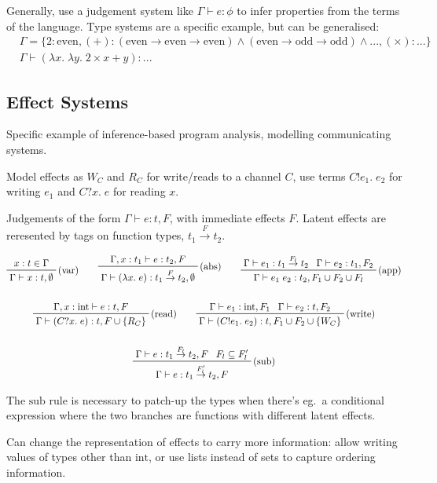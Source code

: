 \documentclass[a4paper, 11pt]{article}
\begin{document}
{
    Generally, use a judgement system like \(\Gamma\vdash e : \phi\) to infer properties from the terms of the language. Type systems are a specific example, but can be generalised:
    \begin{align*}
    & \Gamma = \{2 : \text{even}, (+) : (\text{even}\rightarrow\text{even}\rightarrow\text{even}) \wedge (\text{even}\rightarrow\text{odd}\rightarrow\text{odd}) \wedge ..., (\times) : ...\} \\
    & \Gamma\vdash (\lambda x.\;\lambda y.\;2 \times x + y) : ...
    \end{align*}

    \subsection*{Effect Systems}
    {
        Specific example of inference-based program analysis, modelling communicating systems.

        Model effects as \(W_C\) and \(R_C\) for write/reads to a channel \(C\), use terms \(C!e_1.\;e_2\) for writing \(e_1\) and \(C?x.\;e\) for reading \(x\).

        Judgements of the form \(\Gamma\vdash e : t, F\), with immediate effects \(F\). Latent effects are reresented by tags on function types, \(t_1 \stackrel{F}{\rightarrow} t_2\).

        \begin{gather*}
        \prftree[r]{(var)}
        {x:t \in \Gamma}
        {\Gamma\vdash x : t,\emptyset}
        \qquad
        \prftree[r]{(abs)}
        {\Gamma,x:t_1\vdash e : t_2,F}
        {\Gamma\vdash (\lambda x.\;e) : t_1 \stackrel{F}{\rightarrow} t_2,\emptyset}
        \qquad
        \prftree[r]{(app)}
        {\Gamma\vdash e_1 : t_1 \stackrel{F_l}{\rightarrow} t_2}
        {\Gamma\vdash e_2 : t_1, F_2}
        {\Gamma\vdash e_1\;e_2 : t_2, F_1 \cup F_2 \cup F_l}
        \\
        \\
        \prftree[r]{(read)}
        {\Gamma,x:\text{int}\vdash e : t, F}
        {\Gamma\vdash (C?x.\;e) : t, F \cup \{R_C\}}
        \qquad
        \prftree[r]{(write)}
        {\Gamma\vdash e_1 : \text{int}, F_1}
        {\Gamma\vdash e_2 : t, F_2}
        {\Gamma\vdash (C!e_1.\;e_2) : t, F_1 \cup F_2 \cup \{W_C\}}
        \\
        \\
        \prftree[r]{(sub)}
        {\Gamma\vdash e : t_1 \stackrel{F_l}{\rightarrow} t_2, F}
        {F_l \subseteq F_l'}
        {\Gamma\vdash e : t_1 \stackrel{F_l'}{\rightarrow} t_2, F}
        \end{gather*}

        The \(\text{sub}\) rule is necessary to patch-up the types when there's eg.\ a conditional expression where the two branches are functions with different latent effects.

        Can change the representation of effects to carry more information: allow writing values of types other than \(\text{int}\), or use lists instead of sets to capture ordering information.
    }
}
\end{document}
